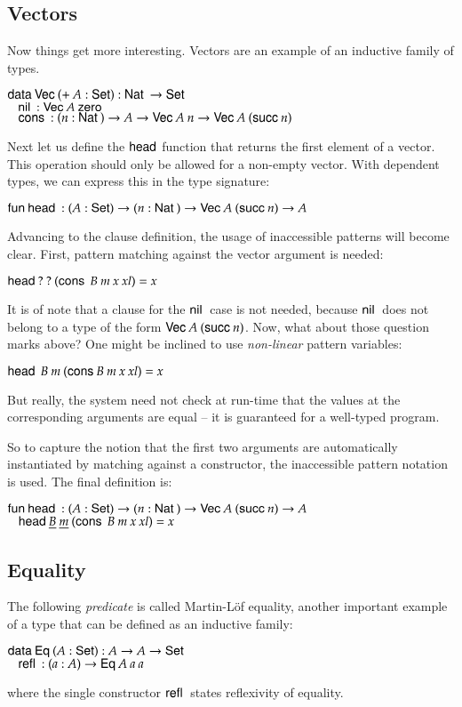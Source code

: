 \subsection{Vectors}
Now things get more interesting. Vectors are an example of an inductive family of types.
\begin{bsp}
$\mathsf{data}\: \mathsf{Vec}\: ( + \: A : \mathsf{Set} ) : \mathsf{Nat}\: \rightarrow \mathsf{Set} $ \\
$\hspace*{3mm} \mathsf{nil}\: : \mathsf{Vec}\: A \: \mathsf{zero}\:  $\\
$ \hspace*{3mm} \mathsf{cons}\: : ( n : \mathsf{Nat}\: ) \rightarrow{ A \rightarrow\mathsf{Vec}\:A \: n \rightarrow\mathsf{Vec}\:A \: (\mathsf{succ}\:n)} $
\end{bsp}
Next let us define the $\mathsf{head}$ function that returns the first element of a vector. This operation should only be allowed for a non-empty vector.
With dependent types, we can express this in the type signature:
\begin{bsp}
$ \mathsf{fun}\: \mathsf{head}\: : ( A : \mathsf{Set} ) \rightarrow ( n : \mathsf{Nat}\: ) \rightarrow \mathsf{Vec}\: A \: (\mathsf{succ}\: n) \rightarrow A $
\end{bsp}
Advancing to the clause definition, the usage of inaccessible patterns will become clear.
First, pattern matching against the vector argument is needed:
\begin{bsp}
$\mathsf{head}\: ? \: ? \: (\mathsf{cons}\: \: B \: m \: x \: xl) = x $
\end{bsp}
It is of note that a clause for the $\mathsf{nil}\:$ case is not needed, because $\mathsf{nil}\:$ does not belong to a type of the form $\mathsf{Vec}\: A \: (\mathsf{succ}\: n)$.
Now, what about those question marks above? 
One might be inclined to use \emph{non-linear} pattern variables:
\begin{bsp}
$\mathsf{head}\: \: B \: m \: (\mathsf{cons}\:  B \: m \: x \: xl) = x $
\end{bsp}
But really, the system need not check at run-time that the values at the corresponding arguments are equal -- it is guaranteed for a well-typed program.

So to capture the notion that the first two arguments are automatically instantiated by matching against a constructor, the inaccessible pattern notation \cite{norell:thesis,GoguHMcBrCM2006} is used. The final definition is:
\begin{bsp}
$ \mathsf{fun}\: \mathsf{head}\: : ( A : \mathsf{Set} ) \rightarrow ( n : \mathsf{Nat}\: ) \rightarrow \mathsf{Vec}\: A \: (\mathsf{succ}\: n) \rightarrow A $\\
$ \hspace*{3mm} \mathsf{head}\: \underline{B} \: \underline{m} \: (\mathsf{cons}\: \: B \: m \: x \: xl) = x $
\end{bsp}
\subsection{Equality}
The following \emph{predicate} is called Martin-L\"of equality, another important example of a type that can be defined as an inductive family:
\begin{bsp}
$\mathsf{data}\: \mathsf{Eq}\: ( A : \mathsf{Set} ) : A \rightarrow A \rightarrow \mathsf{Set} $ \\
$\hspace*{3mm} \mathsf{refl}\: : ( a : A ) \rightarrow{\mathsf{Eq}\:A \: a \: a}$
\end{bsp}
where the single constructor $\mathsf{refl}\:$ states reflexivity of equality.

